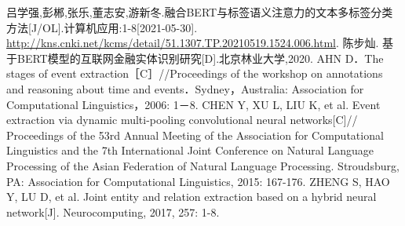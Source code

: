 \documentclass[letterpaper]{article}
\begin{document}
\newpage
\begin{thebibliography}{99}
   吕学强,彭郴,张乐,董志安,游新冬.融合BERT与标签语义注意力的文本多标签分类方法[J/OL].计算机应用:1-8[2021-05-30].
  \url{http://kns.cnki.net/kcms/detail/51.1307.TP.20210519.1524.006.html}.
   陈步灿. 基于BERT模型的互联网金融实体识别研究[D].北京林业大学,2020.
   AHN D．The stages of event extraction［C］//Proceedings of the workshop on annotations and reasoning about time and events．Sydney，Australia: Association for Computational Linguistics，2006: 1－8.
   CHEN Y, XU L, LIU K, et al. Event extraction via dynamic multi-pooling convolutional neural networks[C]// Proceedings of the 53rd Annual Meeting of the Association for Computational Linguistics and the 7th International Joint Conference on Natural Language Processing of the Asian Federation of Natural Language Processing. Stroudsburg, PA: Association for Computational Linguistics, 2015: 167-176.
   ZHENG S, HAO Y, LU D, et al. Joint entity and relation extraction based on a hybrid neural network[J]. Neurocomputing, 2017, 257: 1-8.
\end{thebibliography}
\end{document}
